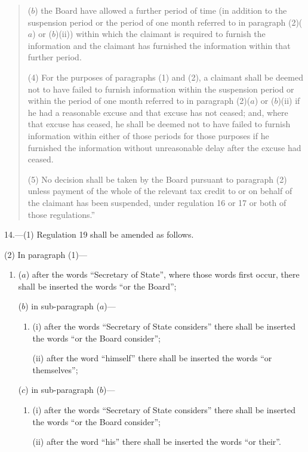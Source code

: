\documentclass[12pt,a4paper]{article}
\begin{document}
\begin{quotation}
\begin{enumerate}
($b$) the Board have allowed a further period of time (in addition to the suspension period or the period of one month referred to in paragraph (2)($a$)  or ($b$)(ii)) within which the claimant is required to furnish the information and the claimant has furnished the information within that further period.
\end{enumerate}

(4) For the purposes of paragraphs (1) and (2), a claimant shall be deemed not to have failed to furnish information within the suspension period or within the period of one month referred to in paragraph (2)($a$)  or ($b$)(ii)  if he had a reasonable excuse and that excuse has not ceased; and, where that excuse has ceased, he shall be deemed not to have failed to furnish information within either of those periods for those purposes if he furnished the information without unreasonable delay after the excuse had ceased.

(5) No decision shall be taken by the Board pursuant to paragraph (2) unless payment of the whole of the relevant tax credit to or on behalf of the claimant has been suspended, under regulation 16 or 17 or both of those regulations.”
\end{quotation}

\medskip

14.---(1)  Regulation 19 shall be amended as follows.

(2) In paragraph (1)—
\begin{enumerate}\item[]
($a$) after the words “Secretary of State”, where those words first occur, there shall be inserted the words “or the Board”;

($b$) in sub-paragraph ($a$)—
\begin{enumerate}\item[]
(i) after the words “Secretary of State considers” there shall be inserted the words “or the Board consider”;

(ii) after the word “himself” there shall be inserted the words “or themselves”;
\end{enumerate}

($c$) in sub-paragraph ($b$)—
\begin{enumerate}\item[]
(i) after the words “Secretary of State considers” there shall be inserted the words “or the Board consider”;

(ii) after the word “his” there shall be inserted the words “or their”.
\end{enumerate}
\end{enumerate}
\end{document}
